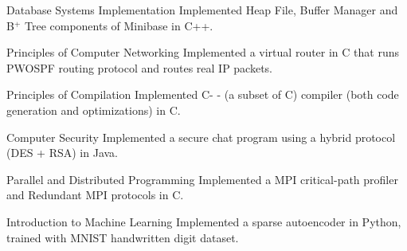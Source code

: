 

\begin{cvskills}

  \cvcourse
    {Database Systems Implementation} %
    {Implemented Heap File, Buffer Manager and B$^+$ Tree components of
    Minibase in C++.} %

  \cvcourse
    {Principles of Computer Networking} %
    {Implemented a virtual router in C that runs PWOSPF routing protocol
    and routes real IP packets.} %

  \cvcourse
    {Principles of Compilation} %
    {Implemented C- - (a subset of C) compiler (both code generation
    and optimizations) in C.}

  \cvcourse
    {Computer Security} %
    {Implemented a secure chat program using a hybrid protocol (DES + RSA) in Java.}

  \cvcourse
    {Parallel and Distributed Programming} %
    {Implemented a MPI critical-path profiler and Redundant MPI protocols in C.}

  \cvcourse
    {Introduction to Machine Learning} %
    {Implemented a sparse autoencoder in Python, trained with MNIST
    handwritten digit dataset.}

\end{cvskills}


